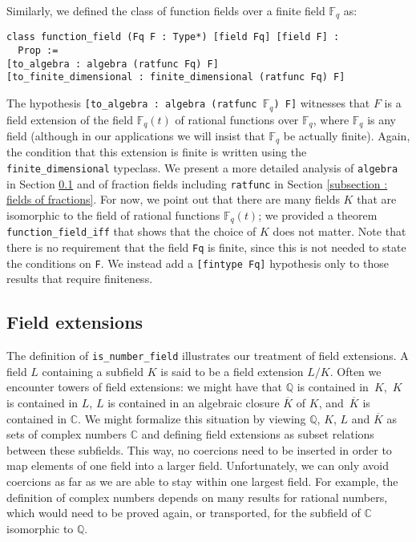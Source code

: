 \documentclass[sn-mathphys]{sn-jnl}%
\renewcommand{\C}{\mathbb{C}}
\newcommand{\lean}[1]{\texttt{#1}\xspace}
\newcommand*{\Fq}[1][q]{\mathbb{F}_{#1}}
\newcommand{\QQ}{\mathbb{Q}}
\begin{document}
Similarly, we defined the class of function fields over a finite field $\Fq$ as:
\begin{lstlisting}
class function_field (Fq F : Type*) [field Fq] [field F] :
  Prop :=
[to_algebra : algebra (ratfunc Fq) F]
[to_finite_dimensional : finite_dimensional (ratfunc Fq) F]
\end{lstlisting}
The hypothesis \lean{[to\_algebra : algebra (ratfunc $\Fq$) F]} witnesses that $F$ is a field extension of the field $\Fq[q](t)$ of rational functions over $\Fq[q]$, where $\Fq[q]$ is any field (although in our applications we will insist that $\Fq[q]$ be actually finite).
Again, the condition that this extension is finite is written using the \lean{finite\_dimensional} typeclass.
We present a more detailed analysis of \lean{algebra} in Section \ref{sec:field_extension} and of fraction fields including \lean{ratfunc} in Section \ref{subsection : fields of fractions}.
For now, we point out that there are many fields $K$ that are isomorphic to the field of rational functions $\Fq[q](t)$; we provided a theorem \lean{function\_field\_iff} that shows that the choice of $K$ does not matter.
Note that there is no requirement that the field \lean{Fq} is finite, since this is not needed to state the conditions on \lean{F}.
We instead add a \lean{[fintype Fq]} hypothesis only to those results that require finiteness.

\subsection{Field extensions} \label{sec:field_extension}

The definition of \lean{is\_number\_field} illustrates our treatment of field extensions.
A field $L$ containing a subfield $K$ is said to be a field extension $L / K$.
Often we encounter towers of field extensions: we might have that $\QQ$ is contained in~$K$,~$K$ is contained in $L$, $L$ is contained in an algebraic closure $\overline{K}$ of $K$, and~$\overline{K}$ is contained in $\C$.
We might formalize this situation by viewing $\QQ$, $K$, $L$ and $\overline{K}$ as sets of complex numbers $\C$ and defining field extensions as subset relations between these subfields.
This way, no coercions need to be inserted in order to map elements of one field into a larger field.
Unfortunately, we can only avoid coercions as far as we are able to stay within one largest field.
For example, the definition of complex numbers depends on many results for rational numbers, which would need to be proved again, or transported, for the subfield of $\C$ isomorphic to $\QQ$.
\end{document}
